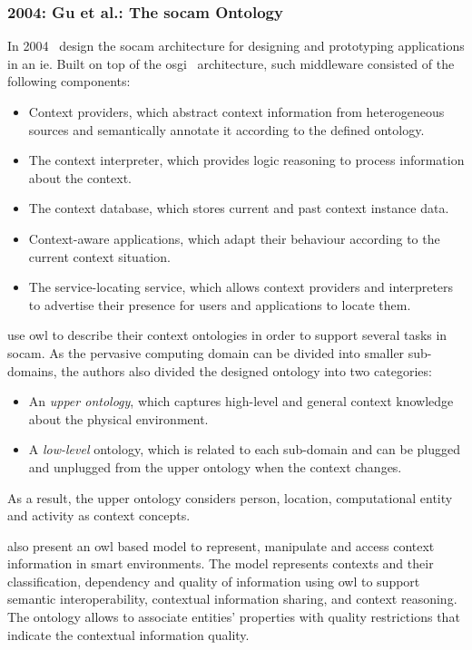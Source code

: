 \subsubsection{2004: Gu et al.: The \ac{socam} Ontology}
\label{sec:gu}

In 2004~\citet{gu_toward_2004} design the \acf{socam} architecture for designing 
and prototyping applications in an \ac{ie}. Built on top of the 
\ac{osgi}~\citep{osgi} architecture, such middleware consisted of the 
following components:

\begin{itemize}
  \item Context providers, which abstract context information from heterogeneous
  sources and semantically annotate it according to the defined ontology.
  \item The context interpreter, which provides logic reasoning to process
  information about the context.
  \item The context database, which stores current and past context instance data.
  \item Context-aware applications, which adapt their behaviour according to the
  current context situation.
  \item The service-locating service, which allows context providers and 
  interpreters to advertise their presence for users and applications to locate 
  them.
\end{itemize}

\citeauthor{gu_toward_2004} use \ac{owl} to describe their context ontologies 
in order to support several tasks in \ac{socam}. As the pervasive computing 
domain can be divided into smaller sub-domains, the authors also divided the 
designed ontology into two categories: 

\begin{itemize}
  \item An \textit{upper ontology}, which captures high-level and general 
  context knowledge about the physical environment.
  \item A \textit{low-level} ontology, which is related to each sub-domain and 
  can be plugged and unplugged from the upper ontology when the context changes.
\end{itemize}

As a result, the upper ontology considers person, location, computational entity
and activity as context concepts.

\bigskip

\citet{gu_ontology_based_2004} also present an \ac{owl} based model to represent, 
manipulate and access context information in smart environments. The model 
represents contexts and their classification, dependency and quality of
information using \ac{owl} to support semantic interoperability, contextual 
information sharing, and context reasoning. The ontology allows to associate 
entities' properties with quality restrictions that indicate the contextual 
information quality. 